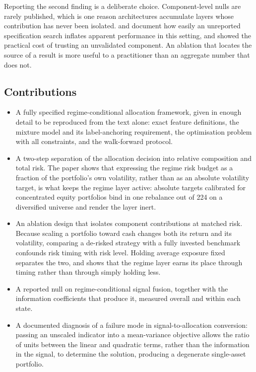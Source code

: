Reporting the second finding is a deliberate choice. Component-level nulls are rarely
published, which is one reason architectures accumulate layers whose contribution has
never been isolated. \citet{harvey15} and \citet{valls26} document how easily an
unreported specification search inflates apparent performance in this setting, and
\citet{demiguel09} showed the practical cost of trusting an unvalidated component. An
ablation that locates the source of a result is more useful to a practitioner than an
aggregate number that does not.

\subsection{Contributions}

\begin{itemize}

\item A fully specified regime-conditional allocation framework, given in enough detail
to be reproduced from the text alone: exact feature definitions, the mixture model and
its label-anchoring requirement, the optimisation problem with all constraints, and the
walk-forward protocol.

\item A two-step separation of the allocation decision into relative composition and
total risk. The paper shows that expressing the regime risk budget as a fraction of the
portfolio's own volatility, rather than as an absolute volatility target, is what keeps
the regime layer active: absolute targets calibrated for concentrated equity portfolios
bind in one rebalance out of 224 on a diversified universe and render the layer inert.

\item An ablation design that isolates component contributions at matched risk. Because
scaling a portfolio toward cash changes both its return and its volatility, comparing a
de-risked strategy with a fully invested benchmark confounds risk timing with risk
level. Holding average exposure fixed separates the two, and shows that the regime
layer earns its place through timing rather than through simply holding less.

\item A reported null on regime-conditional signal fusion, together with the
information coefficients that produce it, measured overall and within each state.

\item A documented diagnosis of a failure mode in signal-to-allocation conversion:
passing an unscaled indicator into a mean-variance objective allows the ratio of units
between the linear and quadratic terms, rather than the information in the signal, to
determine the solution, producing a degenerate single-asset portfolio.

\end{itemize}

